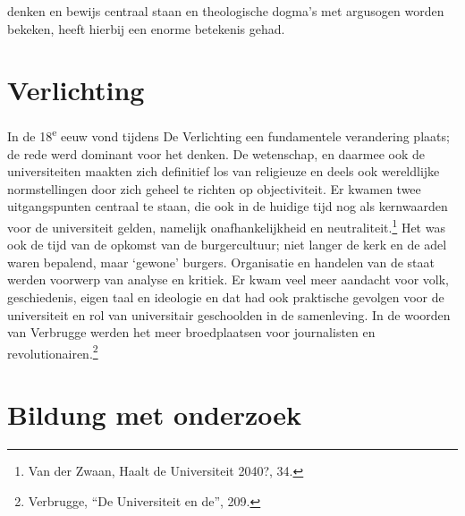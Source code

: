 \documentclass{jote-book}
\begin{document}
denken en bewijs centraal staan en theologische dogma's met argusogen worden bekeken, heeft hierbij een enorme betekenis gehad.



	\section{Verlichting}



	In de 18\textsuperscript{e} eeuw vond tijdens De Verlichting een fundamentele verandering plaats; de rede werd dominant voor het denken. De wetenschap, en daarmee ook de universiteiten maakten zich definitief los van religieuze en deels ook wereldlijke normstellingen door zich geheel te richten op objectiviteit. Er kwamen twee uitgangspunten centraal te staan, die ook in de huidige tijd nog als kernwaarden voor de universiteit gelden, namelijk onafhankelijkheid en neutraliteit.\footnote{Van der Zwaan, Haalt de Universiteit 2040?, 34.} Het was ook de tijd van de opkomst van de burgercultuur; niet langer de kerk en de adel waren bepalend, maar ‘gewone' burgers. Organisatie en handelen van de staat werden voorwerp van analyse en kritiek. Er kwam veel meer aandacht voor volk, geschiedenis, eigen taal en ideologie en dat had ook praktische gevolgen voor de universiteit en rol van universitair geschoolden in de samenleving. In de woorden van Verbrugge werden het meer broedplaatsen voor journalisten en revolutionairen.\footnote{Verbrugge, “De Universiteit en de”, 209.}



	\section{Bildung met onderzoek}
\end{document}
